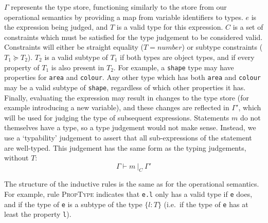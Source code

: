 \documentclass[12pt,a4paper,twoside,openright]{report}
\begin{document}
$\Gamma$ represents the type store, functioning similarly to the store from our
operational semantics by providing a map from variable identifiers to types.
$e$ is the expression being judged, and $T$ is a valid type for this
expression. $C$ is a set of constraints which must be satisfied for the type
judgement to be considered valid. Constraints will either be straight equality
($T = number$) or subtype constraints ($T_1 \succeq T_2$). $T_2$ is a valid
subtype of $T_1$ if both types are object types, and if every property of $T_1$
is also present in $T_2$. For example, a \texttt{shape} type may have
properties for \texttt{area} and \texttt{colour}. Any other type which has both
\texttt{area} and \texttt{colour} may be a valid subtype of \texttt{shape},
regardless of which other properties it has. Finally, evaluating the expression
may result in changes to the type store (for example introducing a new
variable), and these changes are reflected in $\Gamma'$, which will be used for
judging the type of subsequent expressions. Statements $m$ do not themselves
have a type, so a type judgement would not make sense. Instead, we use a
`typability' judgement to assert that all sub-expressions of the statement are
well-typed.  This judgement has the same form as the typing judgements, without
$T$: 
$$\Gamma \vdash m\ |_C\ \Gamma'$$

The structure of the inductive rules is the same as for the operational
semantics. For example, rule \textsc{PropType} indicates that \texttt{e.l} only
has a valid type if \texttt{e} does, and if the type of \texttt{e} is a subtype
of the type $\{l: T\}$ (i.e.~if the type of \texttt{e} has at least the property
\texttt{l}).
\end{document}
